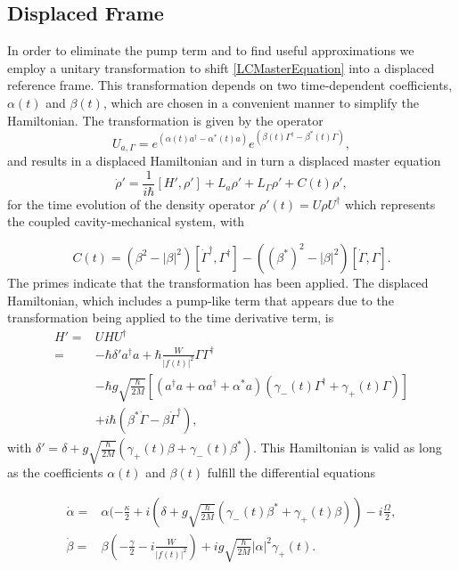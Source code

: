 \documentclass[reprint, amsmath,amssymb, aps,pra]{revtex4-1}
\begin{document}
\subsection{Displaced Frame}

In order to eliminate the pump term and to find useful approximations
we employ a unitary transformation to shift \eqref{LCMasterEquation}
into a displaced reference frame. This transformation depends on two
time-dependent coefficients, $\alpha(t)$ and $\beta(t)$, which are
chosen in a convenient manner to simplify the Hamiltonian. The
transformation is given by the operator
\begin{equation}\label{ShiftTransform}
U_{a,\Gamma} = e^{(\alpha(t) a^\dagger - \alpha^*(t)a)}e^{(\beta(t) \Gamma^\dagger - \beta^*(t)\Gamma)},
\end{equation}
and results in a displaced Hamiltonian and in turn a displaced master
equation
\begin{equation}\label{eq:master_no_small}
\dot{\rho}' = \frac{1}{i\hbar}[H',\rho'] +L_a\rho' + L_\Gamma \rho' + C(t)\rho' ,
\end{equation} for the time evolution of the density operator
$\rho'(t)=U\rho U^\dagger$ which represents the coupled
cavity-mechanical system,  with 

\begin{equation}
C(t)=(\beta^2-|\beta|^2)[\dot{\Gamma}^\dagger,\Gamma^\dagger]-((\beta^*)^2-|\beta|^2)[\dot{\Gamma},\Gamma].
\end{equation}
 The primes indicate that the
transformation has been applied. The displaced Hamiltonian, which
includes a pump-like term that appears due to the transformation being applied to the time derivative term, is
\begin{align}\label{eq:hamiltonian_no_small}
  H'=&U H U^\dagger\nonumber\\=& -\hbar \delta' a^\dagger a + \hbar\frac{W}{|f(t)|^2}\Gamma \Gamma^\dagger\nonumber\\
     &-\hbar g\sqrt{\frac{\hbar}{2M}}[(a^{\dagger}a +\alpha a^{\dagger}+\alpha^* a)(\gamma_-(t)\Gamma^{\dagger}+\gamma_+(t)\Gamma)]\nonumber\\
     &+ i\hbar(\beta^*\dot{\Gamma} - \beta \dot{\Gamma}^\dagger),
\end{align}
with $\delta' = \delta + g\sqrt{\frac{\hbar}{2M}}(\gamma_+(t)\beta + \gamma_-(t)\beta^*)$.
This Hamiltonian is valid as long as the coefficients $\alpha(t)$ and
$\beta(t)$ fulfill the differential equations

\begin{align}\label{eq:displaced_frame}
\dot{\alpha} =& \alpha(-\frac{\kappa}{2}+i(\delta+g\sqrt{\frac{\hbar}{2M}}(\gamma_-(t) \beta^* + \gamma_+(t) \beta))-i\frac{\Omega}{2},\\
\dot{\beta} =& \beta(-\frac{\gamma}{2}-i\frac{W}{|f(t)|^2})+ig\sqrt{\frac{\hbar}{2M}}|\alpha|^2\gamma_+(t).
\end{align}
\end{document}

